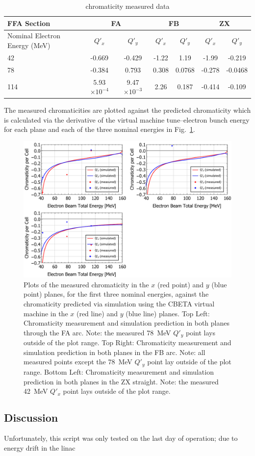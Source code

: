 \documentclass[../main.tex]{subfiles}
\begin{document}
\begin{table}[!h]
\centering
\caption{chromaticity measured data}
\begin{tabular}{lcccccc}
\hline\hline
FFA Section & \multicolumn{2}{c}{FA} & \multicolumn{2}{c}{FB} & \multicolumn{2}{c}{ZX} \\
\hline
Nominal Electron Energy (\si{\mega\electronvolt}) & $Q'_{x}$ & $Q'_{y}$ & $Q'_{x}$ & $Q'_{y}$ & $Q'_{x}$ & $Q'_{y}$ \\
\hline
42 & -0.669 & -0.429 & -1.22 & 1.19 & -1.99 & -0.219 \\
78 & -0.384 & 0.793 & 0.308 & 0.0768 & -0.278 & -0.0468 \\
114 & 5.93$\times 10^{-4}$ & 9.47$\times 10^{-3}$ & 2.26 & 0.187 & -0.414 & -0.109 \\ 
\hline\hline
\end{tabular}
\label{tab:FAFBZX_measured_chromaticity}
\end{table}

The measured chromaticities are plotted against the predicted chromaticity which is calculated via the derivative of the virtual machine tune--electron bunch energy for each plane and each of the three nominal energies in Fig.~\ref{fig:FAFBZX_chromaticity}. 

\begin{figure}[!h]
\centering
\includegraphics[width=\textwidth]{Figures/CBETA_Multi-Pass_Commissioning/chromaticity/FAFBZX_chromaticity.pdf}
\caption{Plots of the measured chromaticity in the $x$ (red point) and $y$ (blue point) planes, for the first three nominal energies, against the chromaticity predicted via simulation using the CBETA virtual machine in the $x$ (red line) and $y$ (blue line) planes. Top Left: Chromaticity measurement and simulation prediction in both planes through the FA arc. Note: the measured 78~\si{\mega\electronvolt} $Q'_{y}$ point lays outside of the plot range. Top Right: Chromaticity measurement and simulation prediction in both planes in the FB arc. Note: all measured points except the 78~\si{\mega\electronvolt} $Q'_{y}$ point lay outside of the plot range. Bottom Left: Chromaticity measurement and simulation prediction in both planes in the ZX straight. Note: the measured 42~\si{\mega\electronvolt} $Q'_{x}$ point lays outside of the plot range.}
\label{fig:FAFBZX_chromaticity}
\end{figure}

\subsection{Discussion}
\label{sec:chromaticity_discussion}

Unfortunately, this script was only tested on the last day of operation; due to energy drift in the linac 
\end{document}
